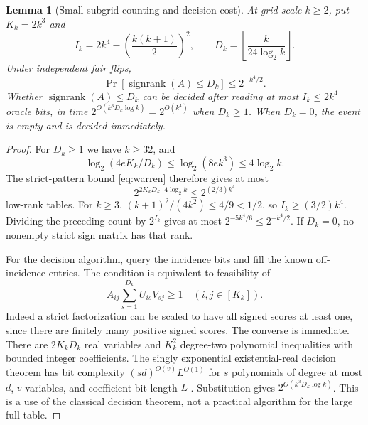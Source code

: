 \documentclass[11pt]{article}
\newtheorem{lemma}[theorem]{Lemma}
\DeclareMathOperator{\sr}{signrank}
\newcommand{\1}{\mathbf 1}
\begin{document}
\begin{samepage}
\begin{lemma}[Small subgrid counting and decision cost]\label{lem:subgrid}
At grid scale $k\ge2$, put $K_k=2k^3$ and
\[
 I_k=2k^4-\left(\frac{k(k+1)}2\right)^2,
 \qquad D_k=\left\lfloor\frac{k}{24\log_2 k}\right\rfloor.
\]
Under independent fair flips,
\[
 \Pr[\sr(A)\le D_k]\le2^{-k^4/2}.
\]
Whether $\sr(A)\le D_k$ can be decided after reading at most $I_k\le2k^4$ oracle bits, in time $2^{O(k^3D_k\log k)}=2^{O(k^4)}$ when $D_k\ge1$. When $D_k=0$, the event is empty and is decided immediately.
\end{lemma}
\end{samepage}
\begin{proof}
For $D_k\ge1$ we have $k\ge32$, and
\[
 \log_2(4eK_k/D_k)\le\log_2(8e k^3)\le4\log_2k.
\]
The strict-pattern bound \eqref{eq:warren} therefore gives at most
\[
 2^{2K_kD_k\cdot4\log_2k}\le2^{(2/3)k^4}
\]
low-rank tables. For $k\ge3$, $(k+1)^2/(4k^2)\le4/9<1/2$, so $I_k\ge(3/2)k^4$. Dividing the preceding count by $2^{I_k}$ gives at most $2^{-5k^4/6}\le2^{-k^4/2}$. If $D_k=0$, no nonempty strict sign matrix has that rank.

For the decision algorithm, query the incidence bits and fill the known off-incidence entries. The condition is equivalent to feasibility of
\[
 A_{ij}\sum_{s=1}^{D_k}U_{is}V_{sj}\ge1\quad(i,j\in[K_k]).
\]
Indeed a strict factorization can be scaled to have all signed scores at least one, since there are finitely many positive signed scores. The converse is immediate. There are $2K_kD_k$ real variables and $K_k^2$ degree-two polynomial inequalities with bounded integer coefficients. The singly exponential existential-real decision theorem has bit complexity $(sd)^{O(v)}L^{O(1)}$ for $s$ polynomials of degree at most $d$, $v$ variables, and coefficient bit length $L$ \citep{Renegar92,Vorobjov21}. Substitution gives $2^{O(k^3D_k\log k)}$. This is a use of the classical decision theorem, not a practical algorithm for the large full table.
\end{proof}
\end{document}
